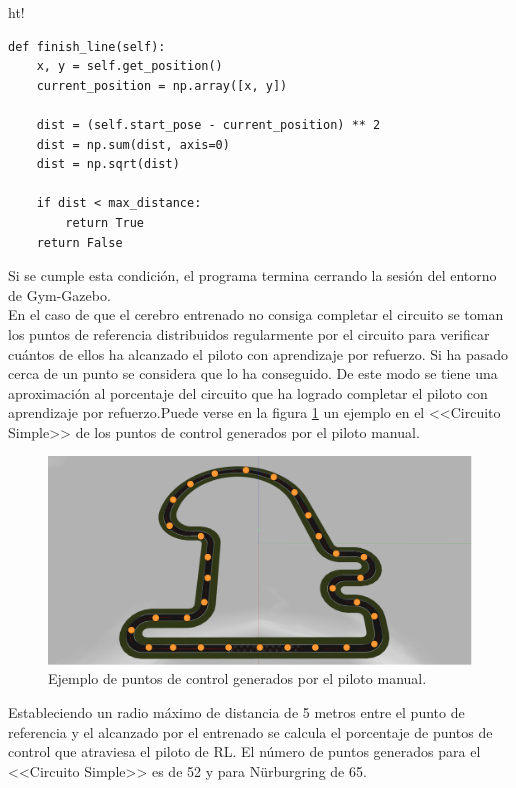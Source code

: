 \vspace{5mm}

\begin{tabular}{ht!}
\begin{lstlisting}[basicstyle=\ttfamily\scriptsize, caption={Cálculo de la distancia al origen del mundo de Gazebo.}, captionpos=b, numbers=none,label={lst:finish-line}, style=Python] 
def finish_line(self):
    x, y = self.get_position()
    current_position = np.array([x, y])

    dist = (self.start_pose - current_position) ** 2
    dist = np.sum(dist, axis=0)
    dist = np.sqrt(dist)
    
    if dist < max_distance:
        return True
    return False
\end{lstlisting}
\end{tabular}

\vspace{5mm}\textbf{}

Si se cumple esta condición, el programa termina cerrando la sesión del entorno de Gym-Gazebo.\\

En el caso de que el cerebro entrenado no consiga completar el circuito se toman los puntos de referencia distribuidos regularmente por el circuito para verificar cuántos de ellos ha alcanzado el piloto con aprendizaje por refuerzo. Si ha pasado cerca de un punto se considera que lo ha conseguido. De este modo se tiene una aproximación al porcentaje del circuito que ha logrado completar el piloto con aprendizaje por refuerzo.Puede verse en la figura \ref{fig:punto_control} un ejemplo en el <<Circuito Simple>> de los puntos de control generados por el piloto manual.

\begin{figure}[ht!]
    \centering \includegraphics[width=0.5\columnwidth]{./figures/chapter_5/balizas_simple.png}
    \caption{Ejemplo de puntos de control generados por el piloto manual.}\label{fig:punto_control}
\end{figure}

Estableciendo un radio máximo de distancia de 5 metros entre el punto de referencia y el alcanzado por el entrenado se calcula el porcentaje de puntos de control que atraviesa el piloto de RL. El número de puntos generados para el <<Circuito Simple>> es de 52 y para Nürburgring de 65.


